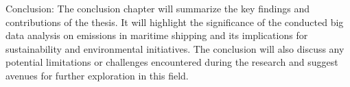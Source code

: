 \noindent Conclusion:
The conclusion chapter will summarize the key findings and contributions of the thesis.
It will highlight the significance of the conducted big data analysis on emissions in maritime shipping and its implications for sustainability and environmental initiatives.
The conclusion will also discuss any potential limitations or challenges encountered during the research and suggest avenues for further exploration in this field.